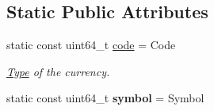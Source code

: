 \subsection*{Static Public Attributes}
\begin{DoxyCompactItemize}
\item 
static const uint64\+\_\+t \mbox{\hyperlink{classaacio_1_1token_a40ec28cfd59953511a2fc98b76cc485a}{code}} = Code
\begin{DoxyCompactList}\small\item\em \mbox{\hyperlink{struct_type}{Type}} of the currency. \end{DoxyCompactList}\item 
\mbox{\label{classaacio_1_1token_ad9aa415b97c906d051885a3845a258e0}} 
static const uint64\+\_\+t {\bfseries symbol} = Symbol
\end{DoxyCompactItemize}
